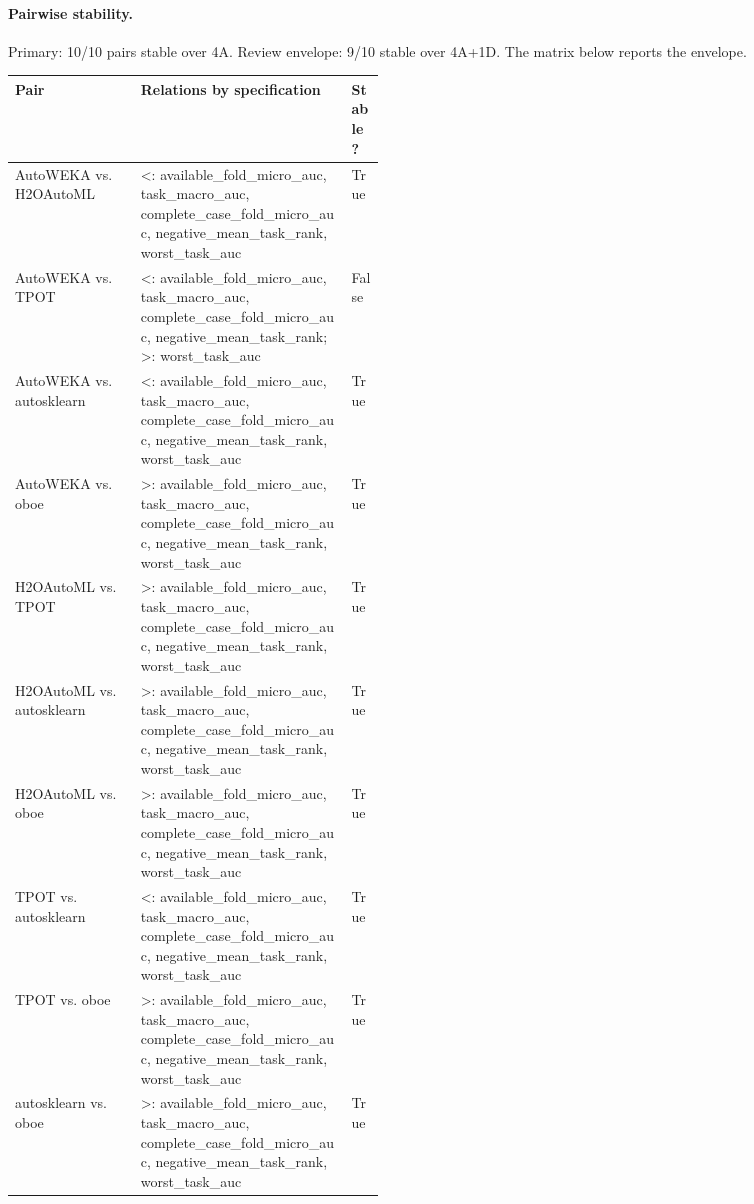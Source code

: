 \paragraph{Pairwise stability.} Primary: 10/10 pairs stable over 4A.  Review envelope: 9/10 stable over 4A+1D.  The matrix below reports the envelope.
\begingroup\scriptsize
\begin{tabularx}{\linewidth}{@{}p{0.34\linewidth}Xp{0.09\linewidth}@{}}
\toprule Pair & Relations by specification & Stable? \\
\midrule
AutoWEKA vs. H2OAutoML & <: available\_fold\_micro\_auc, task\_macro\_auc, complete\_case\_fold\_micro\_auc, negative\_mean\_task\_rank, worst\_task\_auc & True \\
AutoWEKA vs. TPOT & <: available\_fold\_micro\_auc, task\_macro\_auc, complete\_case\_fold\_micro\_auc, negative\_mean\_task\_rank; >: worst\_task\_auc & False \\
AutoWEKA vs. autosklearn & <: available\_fold\_micro\_auc, task\_macro\_auc, complete\_case\_fold\_micro\_auc, negative\_mean\_task\_rank, worst\_task\_auc & True \\
AutoWEKA vs. oboe & >: available\_fold\_micro\_auc, task\_macro\_auc, complete\_case\_fold\_micro\_auc, negative\_mean\_task\_rank, worst\_task\_auc & True \\
H2OAutoML vs. TPOT & >: available\_fold\_micro\_auc, task\_macro\_auc, complete\_case\_fold\_micro\_auc, negative\_mean\_task\_rank, worst\_task\_auc & True \\
H2OAutoML vs. autosklearn & >: available\_fold\_micro\_auc, task\_macro\_auc, complete\_case\_fold\_micro\_auc, negative\_mean\_task\_rank, worst\_task\_auc & True \\
H2OAutoML vs. oboe & >: available\_fold\_micro\_auc, task\_macro\_auc, complete\_case\_fold\_micro\_auc, negative\_mean\_task\_rank, worst\_task\_auc & True \\
TPOT vs. autosklearn & <: available\_fold\_micro\_auc, task\_macro\_auc, complete\_case\_fold\_micro\_auc, negative\_mean\_task\_rank, worst\_task\_auc & True \\
TPOT vs. oboe & >: available\_fold\_micro\_auc, task\_macro\_auc, complete\_case\_fold\_micro\_auc, negative\_mean\_task\_rank, worst\_task\_auc & True \\
autosklearn vs. oboe & >: available\_fold\_micro\_auc, task\_macro\_auc, complete\_case\_fold\_micro\_auc, negative\_mean\_task\_rank, worst\_task\_auc & True \\
\bottomrule\end{tabularx}\endgroup


